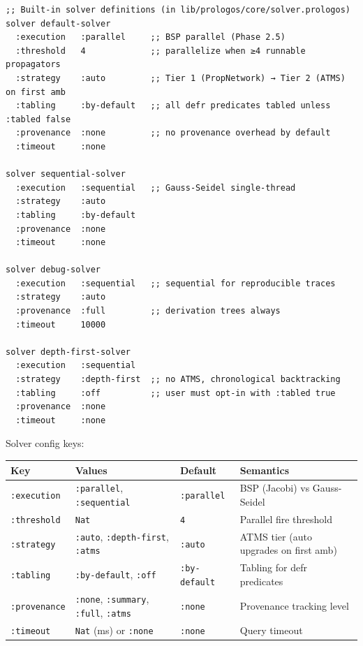 \documentclass[11pt]{article}
\begin{document}
\begin{verbatim}
;; Built-in solver definitions (in lib/prologos/core/solver.prologos)
solver default-solver
  :execution   :parallel     ;; BSP parallel (Phase 2.5)
  :threshold   4             ;; parallelize when ≥4 runnable propagators
  :strategy    :auto         ;; Tier 1 (PropNetwork) → Tier 2 (ATMS) on first amb
  :tabling     :by-default   ;; all defr predicates tabled unless :tabled false
  :provenance  :none         ;; no provenance overhead by default
  :timeout     :none

solver sequential-solver
  :execution   :sequential   ;; Gauss-Seidel single-thread
  :strategy    :auto
  :tabling     :by-default
  :provenance  :none
  :timeout     :none

solver debug-solver
  :execution   :sequential   ;; sequential for reproducible traces
  :strategy    :auto
  :provenance  :full         ;; derivation trees always
  :timeout     10000

solver depth-first-solver
  :execution   :sequential
  :strategy    :depth-first  ;; no ATMS, chronological backtracking
  :tabling     :off          ;; user must opt-in with :tabled true
  :provenance  :none
  :timeout     :none
\end{verbatim}

Solver config keys:

\begin{center}
\begin{tabular}{llll}
Key & Values & Default & Semantics\\
\hline
\texttt{:execution} & \texttt{:parallel}, \texttt{:sequential} & \texttt{:parallel} & BSP (Jacobi) vs Gauss-Seidel\\
\texttt{:threshold} & \texttt{Nat} & \texttt{4} & Parallel fire threshold\\
\texttt{:strategy} & \texttt{:auto}, \texttt{:depth-first}, \texttt{:atms} & \texttt{:auto} & ATMS tier (auto upgrades on first amb)\\
\texttt{:tabling} & \texttt{:by-default}, \texttt{:off} & \texttt{:by-default} & Tabling for defr predicates\\
\texttt{:provenance} & \texttt{:none}, \texttt{:summary}, \texttt{:full}, \texttt{:atms} & \texttt{:none} & Provenance tracking level\\
\texttt{:timeout} & \texttt{Nat} (ms) or \texttt{:none} & \texttt{:none} & Query timeout\\
\end{tabular}
\end{center}
\end{document}
